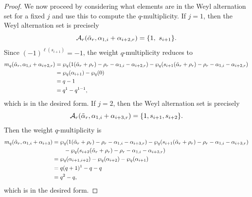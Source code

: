 \documentclass[10pt]{article}
\newcommand{\hr}[0]{\Tilde{\alpha}}
\begin{document}
\begin{proof}
    
    We now proceed by considering what elements are in the Weyl alternation set for a fixed $j$ and use this to compute the $q$-multiplicity.
    If $j=1$, then the Weyl alternation set is precisely
    \begin{equation}
        \mathcal{A}_r(\hr_r,\alpha_{1,i}+\alpha_{i+2,r}) = \{1,~s_{i+1}\}.\notag
    \end{equation}
    Since $(-1)^{\ell(s_{i+1})}=-1$, the weight $q$-multiplicity reduces to
    \begin{align*}
        m_q(\hr_r,\alpha_{1,i}+\alpha_{i+2,r}) &= \wp_q(1(\hr_r+\rho_r)-\rho_r-\alpha_{1,i}-\alpha_{i+2,r})-\wp_q(s_{i+1}(\hr_r+\rho_r)-\rho_r-\alpha_{1,i}-\alpha_{i+2,r}) \\
        &= \wp_q(\alpha_{i+1}) - \wp_q(0) \\ 
        &= q-1\\
        &=q^1-q^{1-1},
    \end{align*}
    which is in the desired form.
    If $j=2$, then the Weyl alternation set is precisely
    \begin{equation}
        \mathcal{A}_r(\hr_r,\alpha_{1,i}+\alpha_{i+3,r}) = \{1,s_{i+1},s_{i+2}\}.\notag
    \end{equation}
    Then the weight $q$-multiplicity is
    \begin{align*}
        m_q(\hr_r,\alpha_{1,i}+\alpha_{i+3}) &= \wp_q(1(\hr_r+\rho_r)-\rho_r-\alpha_{1,i}-\alpha_{i+3,r})-\wp_q(s_{i+1}(\hr_r+\rho_r)-\rho_r-\alpha_{1,i}-\alpha_{i+3,r}) \\
        &\quad\quad -\wp_q(s_{i+2}(\hr_r+\rho_r)-\rho_r-\alpha_{1,i}-\alpha_{i+3,r}) \\
        &= \wp_q(\alpha_{i+1,i+2}) - \wp_q(\alpha_{i+2}) - \wp_q(\alpha_{i+1}) \\
        &= q(q+1)^{1}-q-q \\
        &= q^2-q,
    \end{align*}
    which is in the desired form. 
    

\end{proof}
\end{document}
